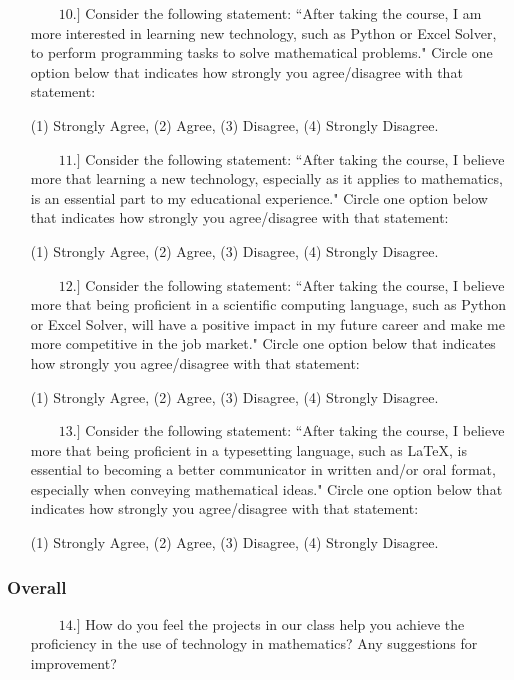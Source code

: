 \documentclass[11pt]{article}
\begin{document}
\begin{enumerate}

\item[{$\qquad 10.]$}] Consider the following statement: ``After taking the course, I am more interested in learning new technology, such as Python or Excel Solver, to perform programming tasks to solve mathematical problems."  Circle one option below that indicates how strongly you agree/disagree with that statement:  
\begin{center} 
(1) Strongly Agree, \qquad (2) Agree, \qquad (3) Disagree, \qquad (4) Strongly Disagree. \end{center}

\item[{$\qquad 11.]$}] Consider the following statement: ``After taking the course, I believe more that learning a new technology, especially as it applies to mathematics, is an essential part to my educational experience."  Circle one option below that indicates how strongly you agree/disagree with that statement:  
\begin{center} 
(1) Strongly Agree, \qquad (2) Agree, \qquad (3) Disagree, \qquad (4) Strongly Disagree. \end{center}

\item[{$\qquad 12.]$}] Consider the following statement: ``After taking the course, I believe more that being proficient in a scientific computing language, such as Python or Excel Solver, will have a positive impact in my future career and make me more competitive in the job market."  Circle one option below that indicates how strongly you agree/disagree with that statement:  
\begin{center} 
(1) Strongly Agree, \qquad (2) Agree, \qquad (3) Disagree, \qquad (4) Strongly Disagree. \end{center}

\item[{$\qquad 13.]$}] Consider the following statement: ``After taking the course, I believe more that being proficient in a typesetting language, such as \LaTeX, is essential to becoming a better communicator in written and/or oral format, especially when conveying mathematical ideas."  Circle one option below that indicates how strongly you agree/disagree with that statement:  
\begin{center} 
(1) Strongly Agree, \qquad (2) Agree, \qquad (3) Disagree, \qquad (4) Strongly Disagree. \end{center}

\end{enumerate}


\subsubsection*{Overall}

\begin{enumerate}

\item[{$\qquad 14.]$}] How do you feel the projects in our class help you achieve the proficiency in the use of technology in mathematics? Any suggestions for improvement? \vfill


\end{enumerate}
\end{document}
